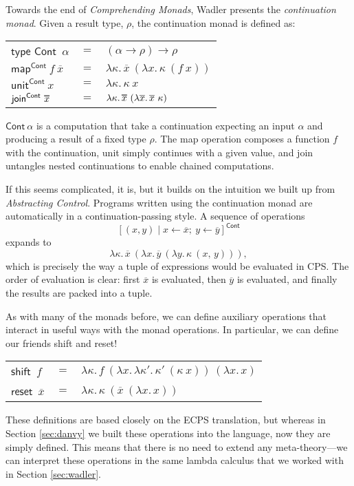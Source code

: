 \documentclass[acmsmall, nonacm, screen]{acmart}
\newcommand\doverline[1]{%
  \setbox0=\hbox{$\overline{#1}$}%
  \ht0=\dimexpr\ht0-.30ex\relax%
  \overline{\copy0}%
}
\newcommand{\lambdaE}[2]{\lambda #1.\, #2}
\newcommand{\map}[3]{\textsf{map}^{\textsf{#1}}~#2~#3}
\newcommand{\unit}[2]{\textsf{unit}^{\textsf{#1}}~#2}
\newcommand{\join}[2]{\textsf{join}^{\textsf{#1}}~#2}
\begin{document}
Towards the end of {\em Comprehending Monads}, Wadler presents the {\em continuation monad}.
Given a result type, $\rho$, the continuation monad is defined as:
\begin{center}
  \begin{tabular}{lll}
    $\textsf{type Cont}$~$\alpha$ & $=$ & $(\alpha \to \rho) \to \rho$ \\
    $\map{Cont}{f}{\overline{x}}$ & $=$ & $\lambdaE{\kappa}{\overline{x}~(\lambdaE{x}{\kappa~(f~x)})}$ \\
    $\unit{Cont}{x}$ & $=$ & $\lambdaE{\kappa}{\kappa~x}$ \\
    $\join{Cont}{\doverline{x}}$ & $=$ &
      $\lambdaE{\kappa}{\doverline{x}~(\lambdaE{\overline{x}}{\overline{x}~\kappa})}$
  \end{tabular}
\end{center}
$\textsf{Cont}~\alpha$ is a computation that take a continuation expecting an input $\alpha$ and
producing a result of a fixed type $\rho$. The \textsf{map} operation composes a function $f$
with the continuation, \textsf{unit} simply continues with a given value, and \textsf{join}
untangles nested continuations to enable chained computations.

If this seems complicated, it is, but it builds on the intuition we built up from {\em
Abstracting Control}. Programs written using the continuation monad are automatically in a
continuation-passing style. A sequence of operations
\[ [(x, y) \mid x \leftarrow \overline{x};\ y \leftarrow \overline{y}]^{\textsf{Cont}} \]
expands to
\[ \lambdaE{\kappa}{\overline{x}~(\lambdaE{x}{\overline{y}~(\lambdaE{y}{\kappa~(x,\, y)})})}, \]
which is precisely the way a tuple of expressions would be evaluated in CPS. The order of
evaluation is clear: first $\overline{x}$ is evaluated, then $\overline{y}$ is evaluated, and
finally the results are packed into a tuple.

As with many of the monads before, we can define auxiliary operations that interact in useful
ways with the monad operations. In particular, we can define our friends \textsf{shift} and
\textsf{reset}!
\begin{center}
  \begin{tabular}{lll}
    $\textsf{shift}$~$f$ & $=$ & $\lambdaE{\kappa}{f~(\lambdaE{x}{\lambdaE{\kappa'}{\kappa'~(\kappa~x)}})~(\lambdaE{x}{x})}$ \\
    $\textsf{reset}$~$\overline{x}$ & $=$ & $\lambdaE{\kappa}{\kappa~(\overline{x}~(\lambdaE{x}{x}))}$
  \end{tabular}
\end{center}
These definitions are based closely on the ECPS translation, but whereas in Section
\ref{sec:danvy} we built these operations into the language, now they are simply defined. This
means that there is no need to extend any meta-theory---we can interpret these operations in the
same lambda calculus that we worked with in Section \ref{sec:wadler}.
\end{document}
